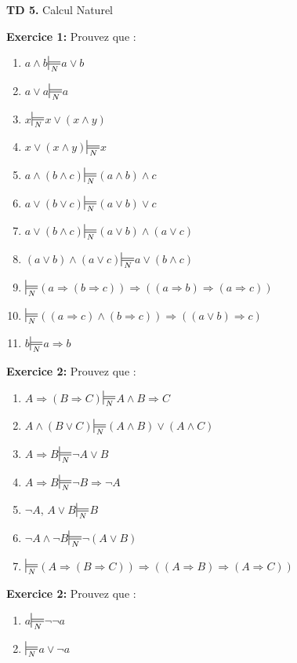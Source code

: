 \documentclass[10pt,a4]{article}
\newcommand{\dednat}[2]{#1\hspace{10pt}$\sdtstile{N}{}$\hspace{10pt}#2}
\newcommand{\Dednat}[1]{$\sdtstile{N}{}$\hspace{10pt}#1}
\newcommand{\imp}{\Rightarrow}
\begin{document}
\begin{center}
\Large{\bf TD 5.} \Large{\sc Calcul Naturel}
\end{center}

{\bf{{\large Exercice 1:}} } Prouvez que :
\begin{enumerate}
\item \dednat{$a\land b$}{$a\lor b$}
\item \dednat{$a \lor a$}{$a$}
\item \dednat{$x$}{$x\lor(x \land y)$}
\item \dednat{$x\lor(x \land y)$}{$x$}
\item \dednat{$a\land (b \land c)$}{$(a\land b) \land c$}
\item \dednat{$a\lor (b \lor c)$}{$(a\lor b) \lor c$}
\item \dednat{$a\lor (b \land c)$}{$(a\lor b) \land (a\lor c)$}
\item \dednat{$(a\lor b) \land (a\lor c)$}{$a\lor (b \land c)$}
\item \Dednat{$\left(a\imp (b\imp c)\right) \imp \left((a\imp b)\imp(a\imp c)\right)$}
\item \Dednat{$\left((a\imp c)\land(b\imp c)\right) \imp \left((a\lor b)\imp c\right)$}
\item \dednat{$b$}{$a\imp b$}
\end{enumerate}

{\bf{{\large Exercice 2:}} } Prouvez que :
\begin{enumerate}
\item \dednat{$A\Rightarrow(B\imp C)$}{$A\land B\Rightarrow C$}
\item \dednat{$A\land (B\lor C)$}{$(A\land B)\lor(A\land C)$}
\item \dednat{$A\imp B$}{$\neg A \lor B$}
\item \dednat{$A \imp B$}{$\neg B \imp \neg A$}
\item \dednat{$\neg A$, $A\lor B$}{$B$}
\item \dednat{$\neg A \land \neg B$}{$\neg (A \lor B)$}
\item \Dednat{$\left(A\imp (B\imp C)\right) \imp \left((A\imp B)\imp(A\imp C)\right)$}
\end{enumerate}

{\bf{{\large Exercice 2:}} } Prouvez que :
\begin{enumerate}
\item \dednat{$a$}{$\neg \neg a$}
\item \Dednat{$a\lor \neg a$}
\end{enumerate}
\end{document}
